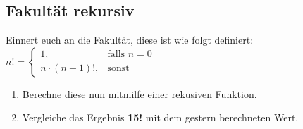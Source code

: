 \subsection{Fakultät rekursiv }
Einnert euch an die Fakultät, diese ist wie folgt definiert:
$n! =\left\{\begin{array}{cl} 1, & \mbox{falls }  n = 0 \\ n \cdot(n-1)!, & \mbox{sonst} \end{array}\right.$
\begin{enumerate}
	\item Berechne diese nun mitmilfe einer rekusiven Funktion.
	\item Vergleiche das Ergebnis \textbf{15!} mit dem gestern berechneten Wert.
\end{enumerate}
